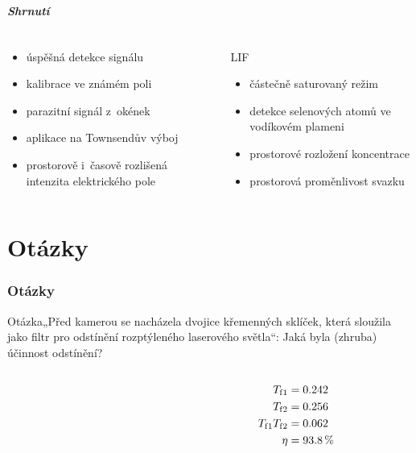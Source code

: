 \documentclass[10pt]{beamer}
\begin{document}
\begin{frame}
	\frametitle{Shrnutí}
	\begin{columns}[t]
	\begin{column}{0.5\textwidth}
		\EFISH
		\begin{itemize}
			\item úspěšná detekce signálu
			\item kalibrace ve známém poli
			\item parazitní signál z~okének
			\item aplikace na Townsendův výboj
			\item prostorově i~časově rozlišená intenzita elektrického pole
		\end{itemize}
	\end{column}
	\begin{column}{0.5\textwidth}
		LIF
		\begin{itemize}
			\item částečně saturovaný režim
			\item detekce selenových atomů ve vodíkovém plameni
			\item prostorové rozložení koncentrace 
			\item prostorová proměnlivost svazku
		\end{itemize}
	\end{column}
	\end{columns}
\end{frame}

\part{Otázky}
\section{Otázky}
\newcommand\question[1]{\begin{block}{Otázka}#1\end{block}\pause}
\begin{frame}
	\partpage
\end{frame}

\begin{frame}
	\question{„Před kamerou se nacházela dvojice křemenných sklíček, která
		sloužila jako filtr pro odstínění rozptýleného laserového světla“:
		Jaká byla (zhruba) účinnost odstínění?}
	\begin{columns}
	\begin{column}{0.75\textwidth}
		
	\end{column}
	\begin{column}{0.25\textwidth}
		\begin{align*}
			T_\text{f}{}_1 &= \num{0.242} \\
			T_\text{f}{}_2 &= \num{0.256} \\
			T_\text{f}{}_1 T_\text{f}{}_2 &= \num{0.062} \\
			\eta &= \SI{93.8}{\percent}
		\end{align*}
	\end{column}
	\end{columns}
\end{frame}
\end{document}
